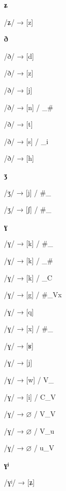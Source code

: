 \begin{center}\textbf{ʑ}\end{center}
\begin{multicols}{4}
\noindent /ʑ/ → [z]
\end{multicols}


\begin{center}\textbf{ð}\end{center}
\begin{multicols}{4}
\noindent /ð/ → [d]

\noindent /ð/ → [z]

\noindent /ð/ → [j]

\noindent /ð/ → [n] / \_\#

\noindent /ð/ → [t]

\noindent /ð/ → [s] / \_i

\noindent /ð/ → [h]
\end{multicols}

\begin{center}\textbf{ʒ}\end{center}
\begin{multicols}{4}
\noindent /ʒ/ → [j] / \#\_

\noindent /ʒ/ → [ʃ] / \#\_
\end{multicols}

\begin{center}\textbf{ɣ}\end{center}
\begin{multicols}{4}
\noindent /ɣ/ → [k] / \#\_

\noindent /ɣ/ → [k] / \_\#

\noindent /ɣ/ → [k] / \_C

\noindent /ɣ/ → [g] / \#\_Vx

\noindent /ɣ/ → [q]

\noindent /ɣ/ → [x] / \#\_

\noindent /ɣ/ → [ʁ]

\noindent /ɣ/ → [j]

\noindent /ɣ/ → [w] / V\_

\noindent /ɣ/ → [i] / C\_V

\noindent /ɣ/ → $\varnothing$ / V\_V

\noindent /ɣ/ → $\varnothing$ / V\_u

\noindent /ɣ/ → $\varnothing$ / u\_V
\end{multicols}


\begin{center}\textbf{ɣʲ}\end{center}
\begin{multicols}{4}
\noindent /ɣʲ/ → [ʑ]
\end{multicols}



